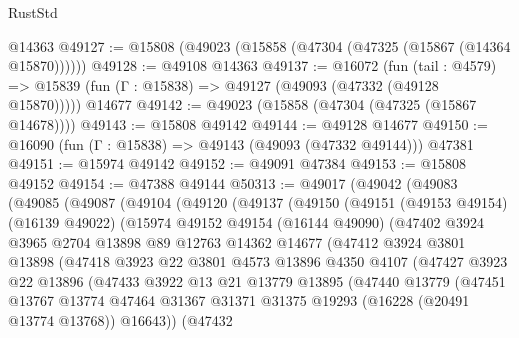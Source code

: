 \begin{lexlean}{RustStd}
\begin{coremodule}
    @14363
@49127 := @15808 (@49023 (@15858 (@47304 (@47325 (@15867 (@14364 @15870))))))
@49128 := @49108 @14363
@49137 := @16072
    (fun (tail : @4579) => @15839 (fun (Γ : @15838) => @49127 (@49093 (@47332 (@49128 @15870)))))
    @14677
@49142 := @49023 (@15858 (@47304 (@47325 (@15867 @14678))))
@49143 := @15808 @49142
@49144 := @49128 @14677
@49150 := @16090 (fun (Γ : @15838) => @49143 (@49093 (@47332 @49144))) @47381
@49151 := @15974 @49142
@49152 := @49091 @47384
@49153 := @15808 @49152
@49154 := @47388 @49144
@50313 := @49017
    (@49042
      (@49083
        (@49085
          (@49087
            (@49104
              (@49120
                (@49137
                  (@49150
                    (@49151
                      (@49153 @49154)
                      (@16139 @49022)
                      (@15974
                        @49152
                        @49154
                        (@16144 @49090)
                        (@47402
                          @3924
                          @3965
                          @2704
                          @13898
                          @89
                          @12763
                          @14362
                          @14677
                          (@47412
                            @3924
                            @3801
                            @13898
                            (@47418
                              @3923
                              @22
                              @3801
                              @4573
                              @13896
                              @4350
                              @4107
                              (@47427
                                @3923
                                @22
                                @13896
                                (@47433
                                  @3922
                                  @13
                                  @21
                                  @13779
                                  @13895
                                  (@47440
                                    @13779
                                    (@47451
                                      @13767
                                      @13774
                                      @47464
                                      @31367
                                      @31371
                                      @31375
                                      @19293
                                      (@16228 (@20491 @13774 @13768))
                                      @16643))
                                  (@47432

\end{coremodule}
\end{lexlean}
